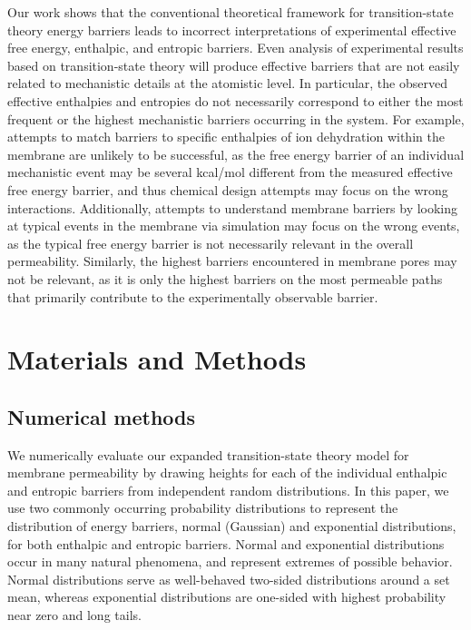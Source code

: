 \documentclass[12pt]{article}
\begin{document}
Our work shows that the conventional theoretical framework for transition-state theory energy barriers leads to incorrect interpretations of experimental effective free energy, enthalpic, and entropic barriers. Even analysis of experimental results based on transition-state theory will produce effective barriers that are not easily related to mechanistic details at the atomistic level. In particular, the observed effective enthalpies and entropies do not necessarily correspond to either the most frequent or the highest mechanistic barriers occurring in the system. For example, attempts to match barriers to specific enthalpies of ion dehydration within the membrane are unlikely to be successful, as the free energy barrier of an individual mechanistic event may be several kcal/mol different from the measured effective free energy barrier, and thus chemical design attempts may focus on the wrong interactions.  Additionally, attempts to understand membrane barriers by looking at typical events in the membrane via simulation may focus on the wrong events, as the typical free energy barrier is not necessarily relevant in the overall permeability. Similarly, the highest barriers encountered in membrane pores may not be relevant, as it is only the highest barriers on the most permeable paths that primarily contribute to the experimentally observable barrier. 

\section*{Materials and Methods}

\subsection*{Numerical methods}

We numerically evaluate our expanded transition-state theory model for membrane permeability by drawing heights for each of the individual enthalpic and entropic barriers from independent random distributions. In this paper, we use two commonly occurring probability distributions to represent the distribution of energy barriers, normal (Gaussian) and exponential distributions, for both enthalpic and entropic barriers. Normal and exponential distributions occur in many natural phenomena, and represent extremes of possible behavior. Normal distributions serve as well-behaved two-sided distributions around a set mean, whereas exponential distributions are one-sided with highest probability near zero and long tails. 
\end{document}
